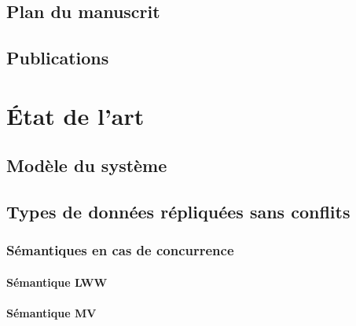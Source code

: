 \documentclass[12pt]{thesul}
\theoremstyle{definition}
\begin{document}
\section{Plan du manuscrit}
\section{Publications}

\NumberThisInToc
\chapter{État de l'art}
\minitoc

\section{Modèle du système}


% 

% 

\section{Types de données répliquées sans conflits}


\subsection{Sémantiques en cas de concurrence}


\subsubsection{Sémantique \acl{LWW}}


\subsubsection{Sémantique \acl{MV}}

\end{document}
